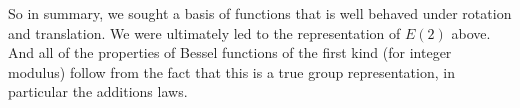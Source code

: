 \documentclass{article}
\begin{document}
So in summary, we sought a basis of functions that is well behaved under rotation and translation.
We were ultimately led to the representation of $E(2)$ above.
And all of the properties of Bessel functions of the first kind (for integer modulus) follow from the fact that this is a true group representation, in particular the additions laws.
\end{document}
